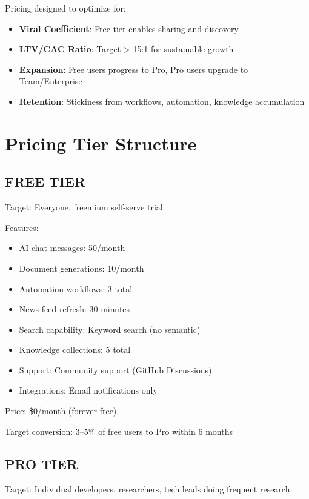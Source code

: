 \documentclass{report}
\begin{document}
Pricing designed to optimize for:
\begin{itemize}
    \item \textbf{Viral Coefficient}: Free tier enables sharing and discovery
    \item \textbf{LTV/CAC Ratio}: Target > 15:1 for sustainable growth
    \item \textbf{Expansion}: Free users progress to Pro, Pro users upgrade to Team/Enterprise
    \item \textbf{Retention}: Stickiness from workflows, automation, knowledge accumulation
\end{itemize}

\section{Pricing Tier Structure}

\subsection{FREE TIER}

Target: Everyone, freemium self-serve trial.

Features:
\begin{itemize}
    \item AI chat messages: 50/month
    \item Document generations: 10/month
    \item Automation workflows: 3 total
    \item News feed refresh: 30 minutes
    \item Search capability: Keyword search (no semantic)
    \item Knowledge collections: 5 total
    \item Support: Community support (GitHub Discussions)
    \item Integrations: Email notifications only
\end{itemize}

Price: \$0/month (forever free)

Target conversion: 3--5\% of free users to Pro within 6 months

\subsection{PRO TIER}

Target: Individual developers, researchers, tech leads doing frequent research.
\end{document}
